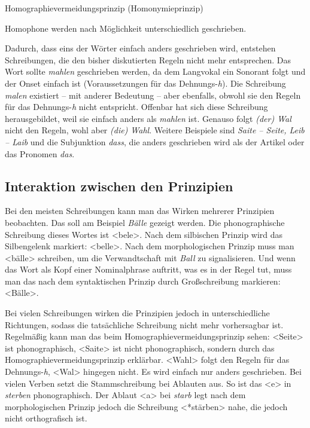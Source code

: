 \begin{Definition}{Homographievermeidungsprinzip 
(Homonymieprinzip)} \label{def:Homographievermeidungsprinzip}

\noindent Homophone werden nach Möglichkeit unterschiedlich geschrieben.

\end{Definition}

Dadurch, dass eins der Wörter einfach anders geschrieben wird, entstehen Schreibungen, die den bisher diskutierten Regeln nicht mehr entsprechen. Das Wort \textipa{[\textprimstress ma:.l@n]} sollte \textit{mahlen} geschrieben werden, da dem Langvokal ein Sonorant folgt und der Onset einfach ist (Voraussetzungen für das Dehnungs-\textit{h}). Die Schreibung \textit{malen} existiert -- mit anderer Bedeutung -- aber ebenfalls, obwohl sie den Regeln für das Dehnungs-\textit{h} nicht entspricht. Offenbar hat sich diese Schreibung herausgebildet, weil sie einfach anders als \textit{mahlen} ist. Genauso folgt \textit{(der) Wal} nicht den Regeln, wohl aber \textit{(die) Wahl}. Weitere Beispiele sind \textit{Saite -- Seite, Leib -- Laib} und die Subjunktion \textit{dass}, die anders geschrieben wird als der Artikel oder das Pronomen \textit{das}.

\subsection{Interaktion zwischen den Prinzipien}

Bei den meisten Schreibungen kann man das Wirken mehrerer Prinzipien beobachten. Das soll am Beispiel \textit{Bälle} gezeigt werden. Die phonographische Schreibung dieses Wortes ist <bele>. Nach dem silbischen Prinzip wird das Silbengelenk markiert: <belle>. Nach dem morphologischen Prinzip muss man <bälle> schreiben, um die Verwandtschaft mit \textit{Ball} zu signalisieren. Und wenn das Wort als Kopf einer Nominalphrase auftritt, was es in der Regel tut, muss man das nach dem syntaktischen Prinzip durch Großschreibung markieren: <Bälle>.

Bei vielen Schreibungen wirken die Prinzipien jedoch in unterschiedliche Richtungen, sodass die tatsächliche Schreibung nicht mehr vorhersagbar ist. Regelmäßig kann man das beim Homographievermeidungsprinzip sehen: <Seite> ist phonographisch, <Saite> ist nicht phonographisch, sondern durch das Homographievermeidungsprinzip erklärbar. <Wahl> folgt den Regeln für das Dehnungs-\textit{h}, <Wal> hingegen nicht. Es wird einfach nur anders geschrieben. Bei vielen Verben setzt die Stammschreibung bei Ablauten aus. So ist das <e> in \textit{sterben} phonographisch. Der Ablaut <a> bei \textit{starb} legt nach dem morphologischen Prinzip jedoch die Schreibung <*stärben> nahe, die jedoch nicht orthografisch ist.

